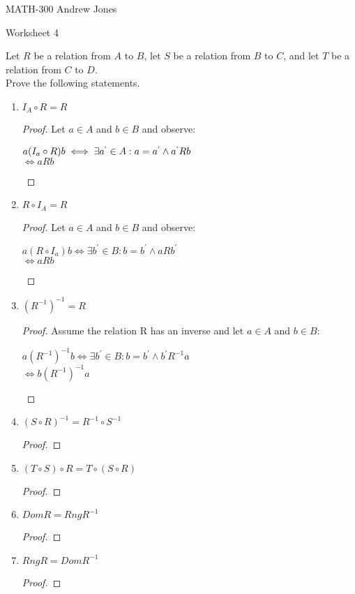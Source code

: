 \documentclass{article}
\begin{document}
    MATH-300 \hfill Andrew Jones
  \begin{center}
  {\huge Worksheet 4}
  \end{center}
  Let $R$ be a relation from $A$ to $B$, let $S$ be a relation from $B$ to $C$, and let $T$ be a relation from $C$ to $D$. \\ Prove the following statements. \\
  \begin{enumerate}
    \item $I_A \circ R = R$
      \begin{proof}
        Let $a\in A$ and $b\in B$ and observe:
        \begin{center}
          $a(I_a \circ R)b \iff \exists a^`\in A: a = a^` \wedge a^`Rb$ \\
          $\iff aRb$
        \end{center}
      \end{proof}
    \item $R \circ I_A = R$
      \begin{proof}
        Let $a\in A$ and $b\in B$ and observe:
        \begin{center}
          $a(R \circ I_a)b \iff \exists b^{'}\in B: b = b^{'} \wedge aRb^{'}$ \\
          $\iff aRb$
        \end{center}
      \end{proof}
    \item $(R^{-1})^{-1} = R$
      \begin{proof}
        Assume the relation R has an inverse and let $a\in A$ and $b\in B$:
        \begin{center}
          $a(R^{-1})^{-1}b \iff \exists b^{'}\in B: b = b^{'} \wedge b^{'}R^{-1}a$ \\
          $\iff b(R^{-1})^{-1}a$
        \end{center}
      \end{proof}
    \item $(S \circ R)^{-1} = R^{-1}\circ S^{-1}$
      \begin{proof}
        
      \end{proof}
    \item $(T \circ S) \circ R = T \circ (S \circ R)$
      \begin{proof}
        
      \end{proof}
    \item $Dom R = Rng R^{-1}$
      \begin{proof}
        
      \end{proof}
    \item $Rng R = Dom R^{-1}$
      \begin{proof}
        
      \end{proof}
  \end{enumerate}
\end{document}

